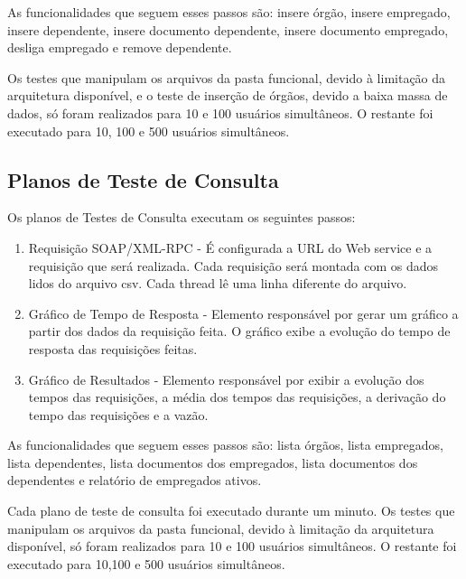 As funcionalidades que seguem esses passos são: insere órgão, insere empregado, insere dependente, insere documento dependente, insere documento empregado, desliga empregado e remove dependente.

Os testes que manipulam os arquivos da pasta funcional, devido à limitação da arquitetura disponível, e o teste de inserção de órgãos, devido a baixa massa de dados, só foram realizados para 10 e 100 usuários simultâneos. O restante foi executado para 10, 100 e 500 usuários simultâneos.

\subsection{Planos de Teste de Consulta}

Os planos de Testes de Consulta executam os seguintes passos:

\begin{enumerate}
\item Requisição SOAP/XML-RPC - É configurada a URL do Web service e a requisição que será realizada. Cada requisição será montada com os dados lidos do arquivo csv. Cada thread lê uma linha diferente do arquivo.
\item Gráfico de Tempo de Resposta -  Elemento responsável por gerar um gráfico a partir dos dados da requisição feita. O gráfico exibe a  evolução do tempo de resposta das requisições feitas.
\item Gráfico de Resultados - Elemento responsável por exibir a evolução dos tempos das requisições, a média dos tempos das requisições, a derivação do tempo das requisições e a vazão.
\end{enumerate}

As funcionalidades que seguem esses passos são: lista órgãos, lista empregados, lista dependentes, lista documentos dos empregados, lista documentos dos dependentes e relatório de empregados ativos.

Cada plano de teste de consulta foi executado durante um minuto. Os testes que manipulam os arquivos da pasta funcional, devido à limitação da arquitetura disponível, só foram realizados para 10 e 100 usuários simultâneos. O restante foi executado para 10,100 e 500 usuários simultâneos.